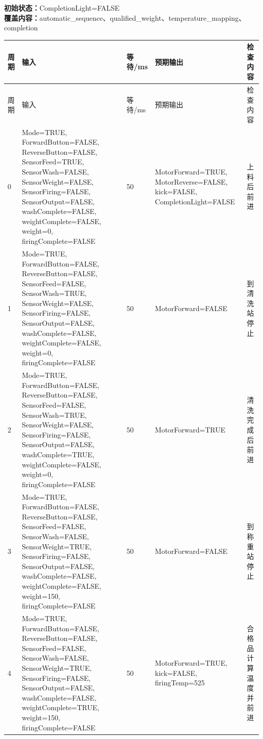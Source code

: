 \noindent\textbf{初始状态：}CompletionLight=FALSE\\

\textbf{覆盖内容：}automatic\_sequence、qualified\_weight、temperature\_mapping、completion

\begin{longtable}{L{1.0cm}L{4.7cm}L{1.4cm}L{4.0cm}L{2.1cm}}

\toprule

周期 & 输入 & 等待/ms & 预期输出 & 检查内容\\

\midrule

\endfirsthead

\toprule

周期 & 输入 & 等待/ms & 预期输出 & 检查内容\\

\midrule

\endhead

0 & Mode=TRUE, ForwardButton=FALSE, ReverseButton=FALSE, SensorFeed=TRUE, SensorWash=FALSE, SensorWeight=FALSE, SensorFiring=FALSE, SensorOutput=FALSE, washComplete=FALSE, weightComplete=FALSE, weight=0, firingComplete=FALSE & 50 & MotorForward=TRUE, MotorReverse=FALSE, kick=FALSE, CompletionLight=FALSE & 上料后前进\\

1 & Mode=TRUE, ForwardButton=FALSE, ReverseButton=FALSE, SensorFeed=FALSE, SensorWash=TRUE, SensorWeight=FALSE, SensorFiring=FALSE, SensorOutput=FALSE, washComplete=FALSE, weightComplete=FALSE, weight=0, firingComplete=FALSE & 50 & MotorForward=FALSE & 到清洗站停止\\

2 & Mode=TRUE, ForwardButton=FALSE, ReverseButton=FALSE, SensorFeed=FALSE, SensorWash=TRUE, SensorWeight=FALSE, SensorFiring=FALSE, SensorOutput=FALSE, washComplete=TRUE, weightComplete=FALSE, weight=0, firingComplete=FALSE & 50 & MotorForward=TRUE & 清洗完成后前进\\

3 & Mode=TRUE, ForwardButton=FALSE, ReverseButton=FALSE, SensorFeed=FALSE, SensorWash=FALSE, SensorWeight=TRUE, SensorFiring=FALSE, SensorOutput=FALSE, washComplete=FALSE, weightComplete=FALSE, weight=150, firingComplete=FALSE & 50 & MotorForward=FALSE & 到称重站停止\\

4 & Mode=TRUE, ForwardButton=FALSE, ReverseButton=FALSE, SensorFeed=FALSE, SensorWash=FALSE, SensorWeight=TRUE, SensorFiring=FALSE, SensorOutput=FALSE, washComplete=FALSE, weightComplete=TRUE, weight=150, firingComplete=FALSE & 50 & MotorForward=TRUE, kick=FALSE, firingTemp=525 & 合格品计算温度并前进\\


\end{longtable}
